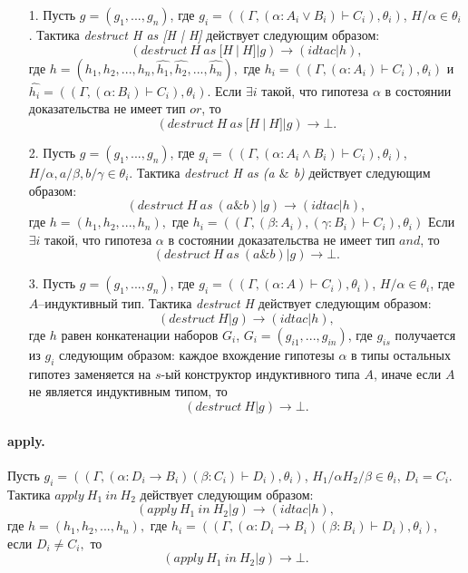 \documentclass[12pt]{article}
\begin{document}
\begin{enumerate}
    \item[1.] Пусть $g = (g_1, ..., g_n)$, где $g_i = ((\Gamma, (\alpha:A_i \vee B_i) \vdash C_i ), \theta_i)$, $H/\alpha \in \theta_i$.
    Тактика \textit{destruct H as [H | H]} действует следующим образом:
$$(destruct\ H\ as\ [H\ |\ H]|g) \xrightarrow{} (idtac| h),$$
где $h=(h_1,h_2,...,h_n,\hat{h_1},\hat{h_2},...,\hat{h_n}),$ где $h_i= ((\Gamma, (\alpha:A_i) \vdash C_i), \theta_i)$ и $\hat{h_i}= ((\Gamma, (\alpha: B_i) \vdash C_i), \theta_i).$
Если $\exists i$ такой, что гипотеза $\alpha$ в состоянии доказательства не имеет тип $or$, то
$$(destruct\ H\ as\ [H\ |\ H]|g) \xrightarrow{} \bot.$$
    \item[2.] Пусть $g = (g_1, ..., g_n)$, где $g_i = ((\Gamma, (\alpha: A_i \wedge B_i) \vdash C_i ), \theta_i)$, $H/\alpha,a/\beta,b/\gamma \in \theta_i$.
    Тактика \textit{destruct H as (a $\&$ b)} действует следующим образом:
    $$(destruct\ H\ as\ (a \& b)|g) \xrightarrow{} (idtac| h),$$
    где $h=(h_1,h_2,...,h_n),$ где $h_i= ((\Gamma, (\beta:A_i), (\gamma:B_i) \vdash C_i), \theta_i)$
    Если $\exists i$ такой, что гипотеза $\alpha$ в состоянии доказательства не имеет тип $and$, то
$$(destruct\ H\ as\ (a \& b)|g) \xrightarrow{} \bot.$$
    \item[3.] Пусть $g = (g_1, ..., g_n)$, где $g_i = ((\Gamma, (\alpha:A) \vdash C_i ), \theta_i)$, $H/\alpha \in \theta_i$, где $A$--индуктивный тип. Тактика \textit{destruct H} действует следующим образом:
    $$(destruct\ H|g) \xrightarrow{} (idtac| h),$$
    где $h$ равен конкатенации наборов $G_i$, $G_i =(g_{i1}, ..., g_{in})$, где $g_{is}$ получается из $g_i$ следующим образом:
    каждое вхождение гипотезы $\alpha$ в типы остальных гипотез заменяется на $s$-ый конструктор индуктивного типа $A$, иначе если $A$ не является индуктивным типом, то
    $$(destruct\ H|g) \xrightarrow{} \bot.$$
\end{enumerate}

\paragraph{apply.}

Пусть $g_i = ((\Gamma, (\alpha:  D_i \xrightarrow{} B_i) (\beta: C_i) \vdash D_i), \theta_i)$, $H_1/\alpha H_2/\beta \in \theta_i$, $D_i = C_i$.
Тактика $apply\ H_1\ in\ H_2$ действует следующим образом:
$$(apply\ H_1\ in\ H_2|g) \xrightarrow{} (idtac| h),$$
где $h=(h_1,h_2,...,h_n),$ где $h_i= ((\Gamma, (\alpha:  D_i \xrightarrow{} B_i) (\beta: B_i) \vdash D_i), \theta_i)$,
если $D_i \neq C_i,$ то
$$(apply\ H_1\ in\ H_2|g) \xrightarrow{} \bot.$$
\end{document}

